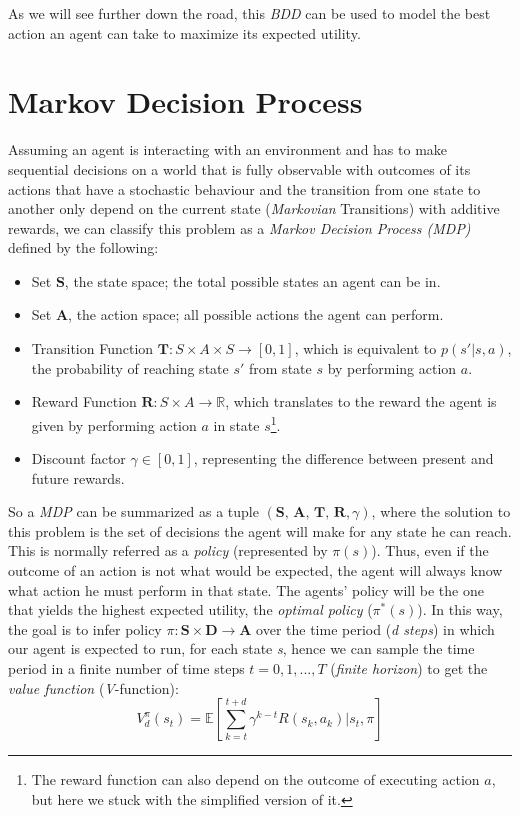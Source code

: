 As we will see further down the road, this \textit{BDD} can be used to model
the best action an agent can take to maximize its expected utility.

\section{Markov Decision Process}

Assuming an agent is interacting with an environment and has to
make sequential decisions on a world that is fully observable with outcomes
of its actions that have a stochastic behaviour and the transition from one
state to another only depend on the current state (\textit{Markovian}
Transitions) with additive rewards, we can classify this problem as a \textit{
Markov Decision Process (MDP)} \cite{Russell2009} defined by the following:
\begin{itemize}
    \item Set $\textbf{S}$, the state space; the total possible states an agent
    can be in.
    \item Set $\textbf{A}$, the action space; all possible actions the agent can
    perform.
    \item Transition Function $\textbf{T}:S \times A \times S \to [0,1]$, which
    is equivalent to $p(s'|s,a)$, the probability of reaching state $s'$ from
    state $s$ by performing action $a$.
    \item Reward Function $\textbf{R}: S \times A \to \mathbb{R}$, which
    translates to the reward the agent is given by performing action $a$ in
    state $s$\footnote{The reward function can also depend on the outcome of
    executing action $a$, but here we stuck with the simplified version of it.}.
    \item Discount factor $ \gamma \in [0,1]$, representing the difference
    between present and future rewards.
\end{itemize}

So a \textit{MDP} can be summarized as a tuple $(\textbf{S, A, T, R},\gamma)$,
where the solution to this problem is the set of decisions the agent will make
for any state he can reach. This is normally referred as a \textit{policy}
(represented by $\pi(s)$). Thus, even if the outcome of an action is not what
would be expected, the agent will always know what action he must perform in
that state. The agents' policy will be the one that yields the highest expected
utility, the \textit{optimal policy} ($\pi^*(s)$). In this way, the goal is
to infer policy $\pi : \textbf{S} \times \textbf{D} \to \textbf{A}$ over the
time period (\textit{d steps}) in which our agent is expected to run, for each
state \textit{s}, hence we can sample the time period in a finite number of time
steps $ t = 0, 1, ..., T$ (\textit{finite horizon}) to get the
\textit{value function} (\textit{V}-function):
\begin{equation}
    \label{eq:reward}
    V_d^\pi(s_t) = \mathbb{E}[\displaystyle\sum_{k=t}^{t+d} \gamma^{k-t}R(s_k,
    a_k)|s_t,\pi]
\end{equation}

